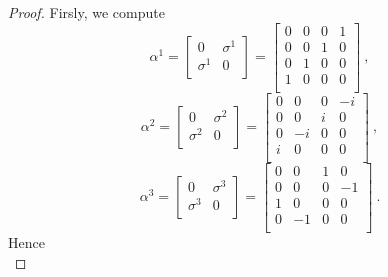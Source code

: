     \begin{proof}
        Firsly, we compute  
        \begin{equation*}
            \alpha^1 = \begin{bmatrix}
                0 & \sigma^1 \\ \sigma^1 & 0 \\
            \end{bmatrix} = \begin{bmatrix}
                0 & 0 & 0 & 1 \\ 
                0 & 0 & 1 & 0 \\ 
                0 & 1 & 0 & 0 \\ 
                1 & 0 & 0 & 0 \\ 
            \end{bmatrix} ~,
        \end{equation*}
        \begin{equation*}
            \alpha^2 = \begin{bmatrix}
                0 & \sigma^2 \\ \sigma^2 & 0 \\
            \end{bmatrix} = \begin{bmatrix}
                0 & 0 & 0 & -i \\ 
                0 & 0 & i & 0 \\ 
                0 & -i & 0 & 0 \\ 
                i & 0 & 0 & 0 \\ 
            \end{bmatrix} ~, 
        \end{equation*}
        \begin{equation*}
            \alpha^3 = \begin{bmatrix}
                0 & \sigma^3 \\ \sigma^3 & 0 \\
            \end{bmatrix} = \begin{bmatrix}
                0 & 0 & 1 & 0 \\ 
                0 & 0 & 0 & -1 \\ 
                1 & 0 & 0 & 0 \\ 
                0 & -1 & 0 & 0 \\ 
            \end{bmatrix} ~.
        \end{equation*}
        Hence
        \begin{equation*}

\end{equation*}
\end{proof}

